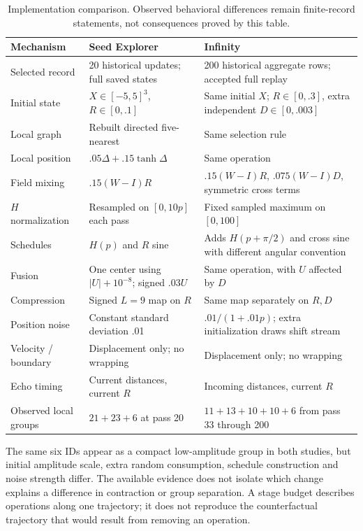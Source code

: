 \documentclass[11pt,a4paper]{article}
\begin{document}
\begin{table}[ht]
\centering\small
\caption{Implementation comparison. Observed behavioral differences remain finite-record statements, not consequences proved by this table.}
\label{tab:comparison}
\begin{tabularx}{\linewidth}{@{}p{29mm}XX@{}}\toprule
Mechanism & Seed Explorer & Infinity\\\midrule
Selected record & 20 historical updates; full saved states & 200 historical aggregate rows; accepted full replay\\
Initial state & $X\in[-5,5]^3$, $R\in[0,.1]$ & Same initial $X$; $R\in[0,.3]$, extra independent $D\in[0,.003]$\\
Local graph & Rebuilt directed five-nearest & Same selection rule\\
Local position & $.05\Delta+.15\tanh\Delta$ & Same operation\\
Field mixing & $.15(W-I)R$ & $.15(W-I)R$, $.075(W-I)D$, symmetric cross terms\\
$H$ normalization & Resampled on $[0,10p]$ each pass & Fixed sampled maximum on $[0,100]$\\
Schedules & $H(p)$ and $R$ sine & Adds $H(p+\pi/2)$ and cross sine with different angular convention\\
Fusion & One center using $|U|+10^{-8}$; signed $.03U$ & Same operation, with $U$ affected by $D$\\
Compression & Signed $L=9$ map on $R$ & Same map separately on $R,D$\\
Position noise & Constant standard deviation .01 & $.01/(1+.01p)$; extra initialization draws shift stream\\
Velocity / boundary & Displacement only; no wrapping & Displacement only; no wrapping\\
Echo timing & Current distances, current $R$ & Incoming distances, current $R$\\
Observed local groups & $21+23+6$ at pass 20 & $11+13+10+10+6$ from pass 33 through 200\\
\bottomrule\end{tabularx}
\end{table}

The same six IDs appear as a compact low-amplitude group in both studies, but initial amplitude scale, extra random consumption, schedule construction and noise strength differ. The available evidence does not isolate which change explains a difference in contraction or group separation. A stage budget describes operations along one trajectory; it does not reproduce the counterfactual trajectory that would result from removing an operation.
\end{document}
